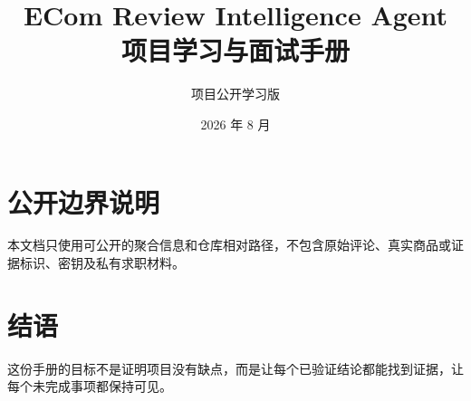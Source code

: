 \documentclass[UTF8,fontset=fandol,11pt,openany]{ctexbook}
\title{ECom Review Intelligence Agent\\项目学习与面试手册}
\author{项目公开学习版}
\date{2026 年 8 月}
\begin{document}
\frontmatter
\maketitle
\chapter*{公开边界说明}
本文档只使用可公开的聚合信息和仓库相对路径，不包含原始评论、真实商品或证据标识、密钥及私有求职材料。
\tableofcontents

\mainmatter
















\backmatter
\chapter*{结语}
这份手册的目标不是证明项目没有缺点，而是让每个已验证结论都能找到证据，让每个未完成事项都保持可见。
\end{document}
